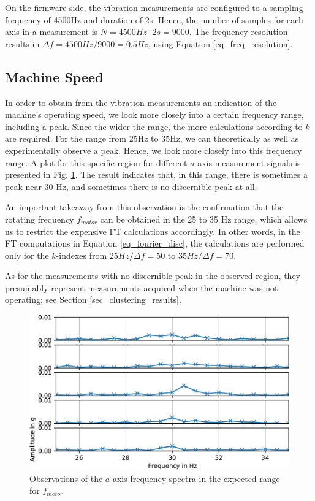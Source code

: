 \documentclass[conference]{IEEEtran}
\begin{document}
On the firmware side, the vibration measurements are configured to a sampling frequency of 4500Hz and duration of 2s. Hence, the number of samples for each axis in a measurement is $N=4500Hz \cdot 2s = 9000$. The frequency resolution results in $\Delta f = 4500Hz/9000 = 0.5 Hz$, using Equation \ref{eq_freq_resolution}.

\subsection{Machine Speed}
\label{sec_machine_speed}

In order to obtain from the vibration measurements an indication of the machine's operating speed, we look more closely into a certain frequency range, including a peak. Since the wider the range, the more calculations according to $k$ are required. For the range from 25Hz to 35Hz, we can theoretically as well as experimentally observe a peak. Hence, we look more closely into this frequency range. A plot for this specific region for different $a$-axis measurement signals is presented in Fig. \ref{fig_motor_frequency}. The result indicates that, in this range, there is sometimes a peak near 30 Hz, and sometimes there is no discernible peak at all. 

An important takeaway from this observation is the confirmation that the rotating frequency $f_{motor}$ can be obtained in the 25 to 35 Hz range, which allows us to restrict the expensive FT calculations accordingly. In other words, in the FT computations in Equation \ref{eq_fourier_disc}, the calculations are performed only for the $k$-indexes from $25Hz/\Delta f = 50$ to $35Hz/\Delta f = 70$.

As for the measurements with no discernible peak in the observed region, they presumably represent measurements acquired when the machine was not operating; see Section \ref{sec_clustering_results}.

\begin{figure}[htbp]
\centerline{\includegraphics[width=\columnwidth]{graphics/motor_frequency/motor_frequency_ohne.pdf}}
\caption{Observations of the $a$-axis frequency spectra in the expected range for $f_{motor}$}
\label{fig_motor_frequency}
\end{figure}
\end{document}
